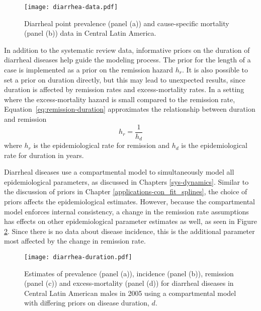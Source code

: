     \begin{figure}[h]
        \begin{center}
            \texttt{[image: diarrhea-data.pdf]}
            \caption{Diarrheal point prevalence (panel (a)) and
              cause-specific mortality (panel (b)) data in Central
              Latin America.}
            \label{fig:app-diarrhea data}
        \end{center}
    \end{figure}

In addition to the
systematic review data, informative priors on the duration of
diarrheal diseases help guide the modeling process.  The prior for the
length of a case is implemented as a prior on the remission hazard
$h_r$.  It is also possible to set a prior on duration directly, but
this may lead to unexpected results, since duration is affected by
remission rates and excess-mortality rates.  In a setting where the excess-mortality hazard is
small compared to the remission rate, Equation~\ref{eq:remission-duration}
approximates the relationship between duration and remission
    \begin{equation} \label{eq:remission-duration}
    	h_{r} = \frac{1}{h_{d}}
    \end{equation}
where $h_{r}$ is the epidemiological rate for remission and $h_{d}$ is
the epidemiological rate for duration in years.

Diarrheal diseases use a compartmental model to simultaneously model all
epidemiological parameters, as
discussed in Chapters \ref{sys-dynamics}.  Similar to the
discussion of priors in Chapter \ref{applications-con_fit_splines},
the choice of priors affects the epidemiological estimates.  However,
because the compartmental model enforces internal consistency, a
change in  the remission rate assumptions has effects
on other epidemiological parameter estimates as well, as seen in
Figure \ref{fig:app-diarrhea duration}.  Since there is no data about
disease incidence, this is the additional parameter most affected by
the change in remission rate.

    \begin{figure}[h]
        \begin{center}
            \texttt{[image: diarrhea-duration.pdf]}
            \caption{Estimates of prevalence (panel (a)), incidence
              (panel (b)), remission (panel (c)) and excess-mortality
              (panel (d)) for diarrheal diseases in Central Latin
              American males in 2005 using a compartmental model with
              differing priors on disease duration, $d$.}
            \label{fig:app-diarrhea duration}
        \end{center}
    \end{figure}

